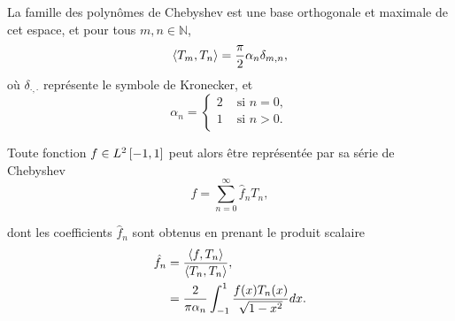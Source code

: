 La famille des polynômes de Chebyshev est une base orthogonale et maximale de cet espace, et pour tous $m,n \in \mathbb{N}$,
\begin{equation}
	\left \langle {T_m}, {T_n} \right \rangle =
	\frac{\pi}{2} \alpha_n \delta_{m,n},
	\label{eq:chebyshev_orthogonality}
\end{equation}
où $\delta_{\cdot,\cdot}$ représente le symbole de Kronecker, et
\begin{equation}
	\alpha_n = 
	\begin{cases}
	 2 & \text{\ si\ } n = 0,   \\ 
	 1 & \text{\ si\ } n > 0.\\ 
	\end{cases}
\end{equation}

Toute fonction $f \in L^2\left[ -1, 1 \right]$ peut alors être représentée par sa série de Chebyshev
\begin{equation}
	f = \sum_{n=0}^{\infty} \hat{f}_n T_n,
	\label{eq:chebyshev_series}
\end{equation}

dont les coefficients $\hat{f}_n$ sont obtenus en prenant le produit scalaire
\begin{align}
	\hat{f}_n 
	&= \frac{\left \langle {f}, {T_n} \right \rangle}{\left \langle {T_n}, {T_n} \right \rangle}, \nonumber \\
	&= \frac{2}{\pi \alpha_n} \int_{-1}^{1} \frac{f(x) T_n(x)}{\sqrt{1 - x^2}} dx.
	\label{eq:chebyshev_series_coeffs}
\end{align}

